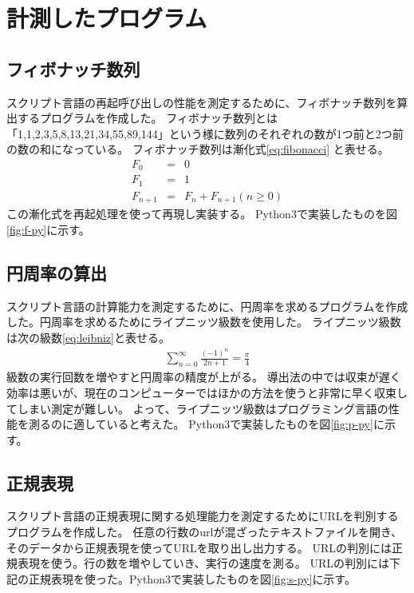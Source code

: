 \chapter{計測したプログラム}
\label{cha:program}

\section{フィボナッチ数列}
スクリプト言語の再起呼び出しの性能を測定するために、フィボナッチ数列を算出するプログラムを作成した。
フィボナッチ数列とは「1,1,2,3,5,8,13,21,34,55,89,144」という様に数列のそれぞれの数が1つ前と2つ前の数の和になっている。
フィボナッチ数列は漸化式\ref{eq:fibonacci} と表せる。
\begin{eqnarray} \label{eq:fibonacci}
  F_{0}&=&0 \nonumber \\
  F_{1}&=&1 \\
  F_{n+1}&=&F_{n}+F_{n+1}(n≥0)\nonumber
\end{eqnarray}
この漸化式を再起処理を使って再現し実装する。
Python3で実装したものを図\ref{fig:f-py}に示す。

\section{円周率の算出}
スクリプト言語の計算能力を測定するために、円周率を求めるプログラムを作成した。円周率を求めるためにライプニッツ級数を使用した。
ライプニッツ級数は次の級数\ref{eq:leibniz}と表せる。
\begin{eqnarray} \label{eq:leibniz}
\sum_{n=0}^{\infty}\frac{(-1)^n}{2n+1}=\frac{\pi}{4}
\end{eqnarray}
級数の実行回数を増やすと円周率の精度が上がる。
導出法の中では収束が遅く効率は悪いが、現在のコンピューターではほかの方法を使うと非常に早く収束してしまい測定が難しい。
よって、ライプニッツ級数はプログラミング言語の性能を測るのに適していると考えた。
Python3で実装したものを図\ref{fig:p-py}に示す。

\section{正規表現}
スクリプト言語の正規表現に関する処理能力を測定するためにURLを判別するプログラムを作成した。
任意の行数のurlが混ざったテキストファイルを開き、そのデータから正規表現を使ってURLを取り出し出力する。
URLの判別には正規表現を使う。行の数を増やしていき、実行の速度を測る。
URLの判別には下記の正規表現を使った。Python3で実装したものを図\ref{fig:s-py}に示す。

